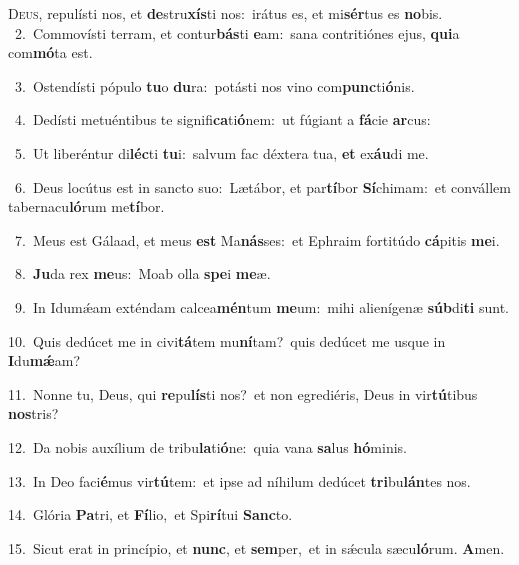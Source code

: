 \lettrine{\initial\textcolor{\initialcolor}{D}}{eus,} repulísti nos, et \textbf{de}\-stru\-\textbf{xís}\-ti nos:~\star irátus es, et mi\-\textbf{sér}\-tus es \textbf{no}\-bis.\\
{\numbfont\textcolor{\numbcolor}{~2.}}~Commovísti terram, et contur\-\textbf{bás}\-ti \textbf{e}\-am:~\star sana contritiónes ejus, \textbf{qui}\-a com\-\textbf{mó}\-ta est.\par
{\numbfont\textcolor{\numbcolor}{~3.}}~Ostendísti pópulo \textbf{tu}\-o \textbf{du}\-ra:~\star potásti nos vino com\-\textbf{punc}\-ti\-\textbf{ó}\-nis.\par
{\numbfont\textcolor{\numbcolor}{~4.}}~Dedísti metuéntibus te signifi\-\textbf{ca}\-ti\-\textbf{ó}\-nem:~\star ut fúgiant a \textbf{fá}\-cie \textbf{ar}\-cus:\par
{\numbfont\textcolor{\numbcolor}{~5.}}~Ut liberéntur di\-\textbf{léc}\-ti \textbf{tu}\-i:~\star salvum fac déxtera tua, \textbf{et} ex\-\textbf{áu}\-di me.\par
{\numbfont\textcolor{\numbcolor}{~6.}}~Deus locútus est in sancto suo:~\dagger Lætábor, et par\-\textbf{tí}\-bor \textbf{Sí}\-chimam:~\star et convállem tabernacu\-\textbf{ló}\-rum me\-\textbf{tí}\-bor.\par
{\numbfont\textcolor{\numbcolor}{~7.}}~Meus est Gálaad, et meus \textbf{est} Ma\-\textbf{nás}\-ses:~\star et Ephraim fortitúdo \textbf{cá}\-pitis \textbf{me}\-i.\par
{\numbfont\textcolor{\numbcolor}{~8.}}~\-\textbf{Ju}\-da rex \textbf{me}\-us:~\star Moab olla \textbf{spe}\-i \textbf{me}\-æ.\par
{\numbfont\textcolor{\numbcolor}{~9.}}~In Idumǽam exténdam calcea\-\textbf{mén}\-tum \textbf{me}\-um:~\star mihi alienígenæ \textbf{súb}\-di\textbf{ti} sunt.\par
{\numbfont\textcolor{\numbcolor}{10.}}~Quis dedúcet me in civi\-\textbf{tá}\-tem mu\-\textbf{ní}\-tam?~\star quis dedúcet me usque in \textbf{I}\-du\-\textbf{mǽ}\-am?\par
{\numbfont\textcolor{\numbcolor}{11.}}~Nonne tu, Deus, qui \textbf{re}\-pu\-\textbf{lís}\-ti nos?~\star et non egrediéris, Deus in vir\-\textbf{tú}\-tibus \textbf{nos}\-tris?\par
{\numbfont\textcolor{\numbcolor}{12.}}~Da nobis auxílium de tribu\-\textbf{la}\-ti\-\textbf{ó}\-ne:~\star quia vana \textbf{sa}\-lus \textbf{hó}\-minis.\par
{\numbfont\textcolor{\numbcolor}{13.}}~In Deo faci\-\textbf{é}\-mus vir\-\textbf{tú}\-tem:~\star et ipse ad níhilum dedúcet \textbf{tri}\-bu\-\textbf{lán}\-tes nos.\par
{\numbfont\textcolor{\numbcolor}{14.}}~Glória \textbf{Pa}\-tri, et \textbf{Fí}\-lio,~\star et Spi\-\textbf{rí}\-tui \textbf{Sanc}\-to.\par
{\numbfont\textcolor{\numbcolor}{15.}}~Sicut erat in princípio, et \textbf{nunc}\-, et \textbf{sem}\-per,~\star et in sǽcula sæcu\-\textbf{ló}\-rum. \textbf{A}\-men.\par
